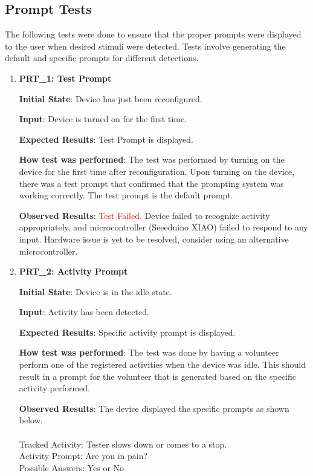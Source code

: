 \documentclass[12pt, titlepage]{article}
\begin{document}
\subsection{Prompt Tests}

The following tests were done to ensure that the proper prompts were displayed to the user when desired stimuli were detected. Tests involve generating the default and specific prompts for different detections.

\begin{enumerate}
  \item{\textbf{PRT\_1: Test Prompt} \\}\label{PRT1}

  \textbf{Initial State}: Device has just been reconfigured.

  \textbf{Input}: Device is turned on for the first time.

  \textbf{Expected Results}: Test Prompt is displayed.

  \textbf{How test was performed}: The test was performed by turning on the device for the first time after reconfiguration. Upon turning on the device, there was a test prompt that confirmed that the prompting system was working correctly. The test prompt is the default prompt.

  \textbf{Observed Results}: \textcolor{red}{Test Failed.} Device failed to recognize activity appropriately, and microcontroller (Seeeduino XIAO) failed to respond to any input. Hardware issue is yet to be resolved, consider using an alternative microcontroller.

  \item{\textbf{PRT\_2: Activity Prompt} \\}\label{PRT2}

  \textbf{Initial State}: Device is in the idle state.

  \textbf{Input}: Activity has been detected.

  \textbf{Expected Results}: Specific activity prompt is displayed.

  \textbf{How test was performed}: The test was done by having a volunteer perform one of the registered activities when the device was idle. This should result in a prompt for the volunteer that is generated based on the specific activity performed.

  \textbf{Observed Results}: The device displayed the specific prompts as shown below.\\\\
  Tracked Activity: Tester slows down or comes to a stop.\\
  Activity Prompt: Are you in pain?\\
  Possible Answers: Yes or No

\end{enumerate}
\end{document}
